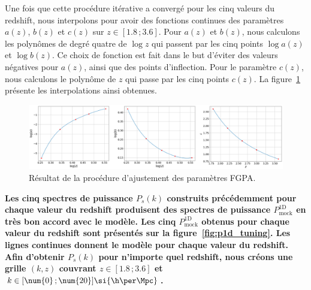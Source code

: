 Une fois que cette procédure itérative a convergé pour les cinq valeurs du redshift, nous interpolons pour avoir des fonctions continues des paramètres $a(z)$, $b(z)$ et $c(z)$ sur $z \in [\num{1.8} \, ; \num{3.6}]$. Pour $a(z)$ et $b(z)$, nous calculons les polynômes de degré quatre de $\log z$ qui passent par les cinq points $\log a(z)$ et $\log b(z)$. Ce choix de fonction est fait dans le but d'éviter des valeurs négatives pour $a(z)$, ainsi que des points d'inflection. Pour le paramètre $c(z)$, nous calculons le polynôme de $z$ qui passe par les cinq points $c(z)$.
La figure~\ref{fig:params} présente les interpolations ainsi obtenues.
\begin{figure}
  \centering
  \includegraphics[scale=0.4]{params}
  \caption{Résultat de la procédure d'ajustement des paramètres FGPA.}
  \label{fig:params}
\end{figure}
\textbf{Les cinq spectres de puissance $P_{s}(k)$ construits précédemment pour chaque valeur du redshift produisent des spectres de puissance $P^{\mathrm{1D}}_{\mathrm{mock}}$ en très bon accord avec le modèle. Les cinq $P^{\mathrm{1D}}_{\mathrm{mock}}$ obtenus pour chaque valeur du redshift sont présentés sur la figure~\ref{fig:p1d_tuning}. Les lignes continues donnent le modèle pour chaque valeur du redshift.
Afin d'obtenir $P_{s}(k)$ pour n'importe quel redshift, nous créons une grille $(k, z)$ couvrant $z \in [\num{1.8} \, ; \num{3.6}]$ et $k \in [\num{0} \, ; \num{20}] \si{\h\per\Mpc}$.}
